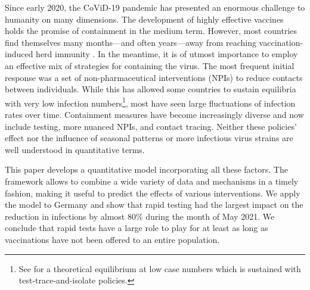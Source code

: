 


Since early 2020, the CoViD-19 pandemic has presented an enormous challenge to humanity
on many dimensions. The development of highly effective vaccines holds the promise of
containment in the medium term. However, most countries find themselves many
months---and often years---away from reaching vaccination-induced herd immunity
\citep{Swaminathan2021}. In the meantime, it is of utmost importance to employ an effective
mix of strategies for containing the virus. The most frequent initial response was a set
of non-pharmaceutical interventions (NPIs) to reduce contacts between individuals. While
this has allowed some countries to sustain equilibria with very low infection
numbers\footnote{See \citet{Contreras2021} for a theoretical equilibrium at low case
numbers which is sustained with test-trace-and-isolate policies.}, most have seen large
fluctuations of infection rates over time. Containment measures have become increasingly
diverse and now include testing, more nuanced NPIs, and contact tracing. Neither these
policies' effect nor the influence of seasonal patterns or more infectious virus strains
are well understood in quantitative terms.

This paper develops a quantitative model incorporating all these factors. The framework
allows to combine a wide variety of data and mechanisms in a timely fashion, making it
useful to predict the effects of various interventions. We apply the model to Germany
and show that rapid testing had the largest impact on the reduction in infections by
almost 80\% during the month of May 2021. We conclude that rapid tests have a large role
to play for at least as long as vaccinations have not been offered to an entire
population.

